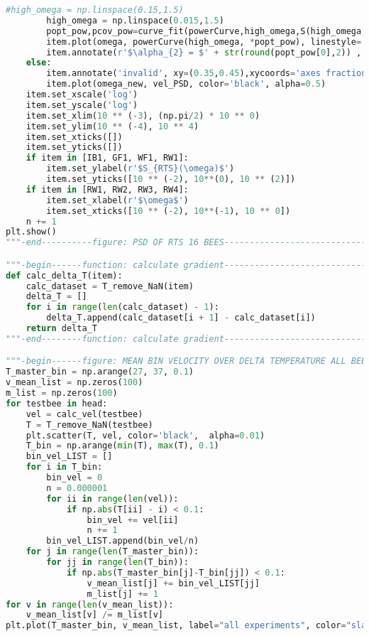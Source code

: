 \begin{lstlisting}[language=Python, basicstyle=\tiny, frame=single, keywordstyle=\color{teal}, commentstyle=\color{olive}, stringstyle=\color{red}]
        #high_omega = np.linspace(0.15,1.5)
        high_omega = np.linspace(0.015,1.5)
        popt_pow,pcov_pow=curve_fit(powerCurve,high_omega,S(high_omega,mean_velocity,mean_t1,data_entries,dT),maxfev=200000, p0=(0))
        item.plot(omega, powerCurve(high_omega, *popt_pow), linestyle='dashed', color='red')
        item.annotate(r'$\alpha_{2} = $' + str(round(popt_pow[0],2)) , xy=(0.05,0.8),xycoords='axes fraction', fontsize=12)
    else:
        item.annotate('invalid', xy=(0.35,0.45),xycoords='axes fraction', color='red', fontsize=12)
        item.plot(omega_new, vel_PSD, color='black', alpha=0.5)
    item.set_xscale('log')
    item.set_yscale('log')
    item.set_xlim(10 ** (-3), (np.pi/2) * 10 ** 0)
    item.set_ylim(10 ** (-4), 10 ** 4)
    item.set_xticks([])
    item.set_yticks([])
    if item in [IB1, GF1, WF1, RW1]:
        item.set_ylabel(r'$S_{RTS}(\omega)$')
        item.set_yticks([10 ** (-2), 10**(0), 10 ** (2)])
    if item in [RW1, RW2, RW3, RW4]:
        item.set_xlabel(r'$\omega$')
        item.set_xticks([10 ** (-2), 10**(-1), 10 ** 0])
    n += 1
plt.show()
"""-end----------figure: PSD OF RTS 16 BEES----------------------------------"""

"""-begin------function: calculate gradient----------------------------------"""
def calc_delta_T(item):
    calc_dataset = T_remove_NaN(item)
    delta_T = []
    for i in range(len(calc_dataset) - 1):
        delta_T.append(calc_dataset[i + 1] - calc_dataset[i])
    return delta_T
"""-end--------function: calculate gradient----------------------------------"""

"""-begin------figure: MEAN BIN VELOCITY OVER DELTA TEMPERATURE ALL BEES-----"""
T_master_bin = np.arange(27, 37, 0.1)
v_mean_list = np.zeros(100)
m_list = np.zeros(100)
for testbee in head:
    vel = calc_vel(testbee)
    T = T_remove_NaN(testbee)
    plt.scatter(T, vel, color='black',  alpha=0.01)
    T_bin = np.arange(min(T), max(T), 0.1)
    bin_vel_LIST = []
    for i in T_bin:
        bin_vel = 0
        n = 0.000001
        for ii in range(len(vel)):
            if np.abs(T[ii] - i) < 0.1:
                bin_vel += vel[ii]
                n += 1
        bin_vel_LIST.append(bin_vel/n)
    for j in range(len(T_master_bin)):
        for jj in range(len(T_bin)):
            if np.abs(T_master_bin[j]-T_bin[jj]) < 0.1:
                v_mean_list[j] += bin_vel_LIST[jj]
                m_list[j] += 1
for v in range(len(v_mean_list)):
    v_mean_list[v] /= m_list[v]
plt.plot(T_master_bin, v_mean_list, label="all experiments", color="slategrey", linewidth=2)


\end{lstlisting}
